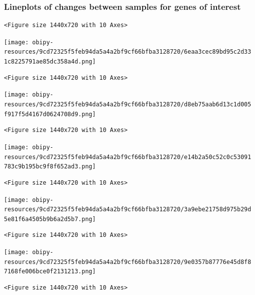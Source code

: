 \documentclass[a4paper]{article}
\begin{document}
\subsubsection{Lineplots of changes between samples for genes of interest}
\label{sec:org0c7b177}
\begin{verbatim}
<Figure size 1440x720 with 10 Axes>
\end{verbatim}

\begin{center}
\texttt{[image: obipy-resources/9cd72325f5feb94da5a4a2bf9cf66bfba3128720/6eaa3cec89bd95c2d331c8225791ae85dc358a4d.png]}
\end{center}

\begin{verbatim}
<Figure size 1440x720 with 10 Axes>
\end{verbatim}

\begin{center}
\texttt{[image: obipy-resources/9cd72325f5feb94da5a4a2bf9cf66bfba3128720/d8eb75aab6d13c1d005f917f5d4167d0624708d9.png]}
\end{center}

\begin{verbatim}
<Figure size 1440x720 with 10 Axes>
\end{verbatim}

\begin{center}
\texttt{[image: obipy-resources/9cd72325f5feb94da5a4a2bf9cf66bfba3128720/e14b2a50c52c0c53091783c9b195bc9f8f652ad3.png]}
\end{center}

\begin{verbatim}
<Figure size 1440x720 with 10 Axes>
\end{verbatim}

\begin{center}
\texttt{[image: obipy-resources/9cd72325f5feb94da5a4a2bf9cf66bfba3128720/3a9ebe21758d975b29d5e81f6a4505b9b6a2d5b7.png]}
\end{center}

\begin{verbatim}
<Figure size 1440x720 with 10 Axes>
\end{verbatim}

\begin{center}
\texttt{[image: obipy-resources/9cd72325f5feb94da5a4a2bf9cf66bfba3128720/9e0357b87776e45d8f87168fe006bce0f2131213.png]}
\end{center}

\begin{verbatim}
<Figure size 1440x720 with 10 Axes>
\end{verbatim}
\end{document}
